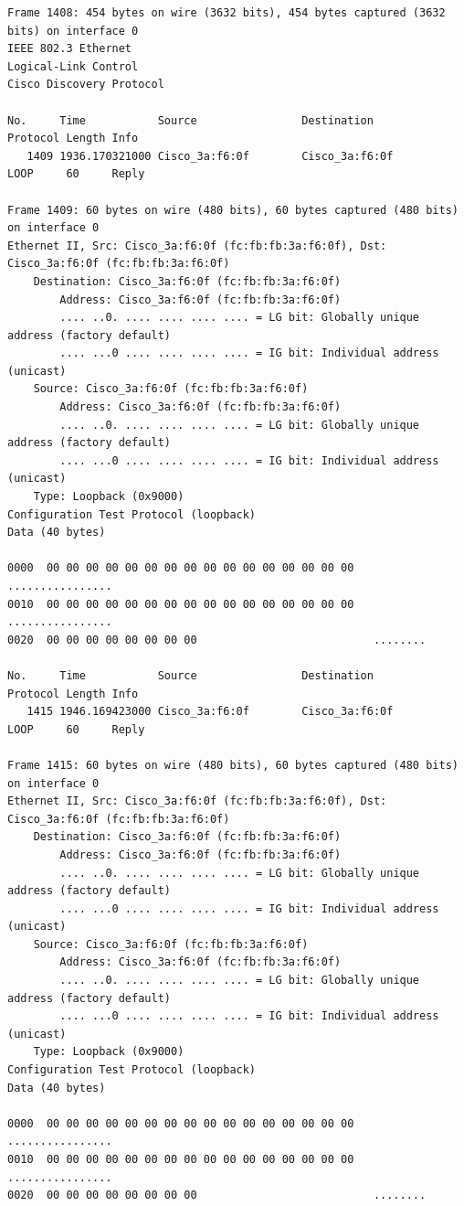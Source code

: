 \documentclass[a4paper,11pt]{article}
\begin{document}
\begin{lstlisting}
Frame 1408: 454 bytes on wire (3632 bits), 454 bytes captured (3632 bits) on interface 0
IEEE 802.3 Ethernet 
Logical-Link Control
Cisco Discovery Protocol

No.     Time           Source                Destination           Protocol Length Info
   1409 1936.170321000 Cisco_3a:f6:0f        Cisco_3a:f6:0f        LOOP     60     Reply

Frame 1409: 60 bytes on wire (480 bits), 60 bytes captured (480 bits) on interface 0
Ethernet II, Src: Cisco_3a:f6:0f (fc:fb:fb:3a:f6:0f), Dst: Cisco_3a:f6:0f (fc:fb:fb:3a:f6:0f)
    Destination: Cisco_3a:f6:0f (fc:fb:fb:3a:f6:0f)
        Address: Cisco_3a:f6:0f (fc:fb:fb:3a:f6:0f)
        .... ..0. .... .... .... .... = LG bit: Globally unique address (factory default)
        .... ...0 .... .... .... .... = IG bit: Individual address (unicast)
    Source: Cisco_3a:f6:0f (fc:fb:fb:3a:f6:0f)
        Address: Cisco_3a:f6:0f (fc:fb:fb:3a:f6:0f)
        .... ..0. .... .... .... .... = LG bit: Globally unique address (factory default)
        .... ...0 .... .... .... .... = IG bit: Individual address (unicast)
    Type: Loopback (0x9000)
Configuration Test Protocol (loopback)
Data (40 bytes)

0000  00 00 00 00 00 00 00 00 00 00 00 00 00 00 00 00   ................
0010  00 00 00 00 00 00 00 00 00 00 00 00 00 00 00 00   ................
0020  00 00 00 00 00 00 00 00                           ........

No.     Time           Source                Destination           Protocol Length Info
   1415 1946.169423000 Cisco_3a:f6:0f        Cisco_3a:f6:0f        LOOP     60     Reply

Frame 1415: 60 bytes on wire (480 bits), 60 bytes captured (480 bits) on interface 0
Ethernet II, Src: Cisco_3a:f6:0f (fc:fb:fb:3a:f6:0f), Dst: Cisco_3a:f6:0f (fc:fb:fb:3a:f6:0f)
    Destination: Cisco_3a:f6:0f (fc:fb:fb:3a:f6:0f)
        Address: Cisco_3a:f6:0f (fc:fb:fb:3a:f6:0f)
        .... ..0. .... .... .... .... = LG bit: Globally unique address (factory default)
        .... ...0 .... .... .... .... = IG bit: Individual address (unicast)
    Source: Cisco_3a:f6:0f (fc:fb:fb:3a:f6:0f)
        Address: Cisco_3a:f6:0f (fc:fb:fb:3a:f6:0f)
        .... ..0. .... .... .... .... = LG bit: Globally unique address (factory default)
        .... ...0 .... .... .... .... = IG bit: Individual address (unicast)
    Type: Loopback (0x9000)
Configuration Test Protocol (loopback)
Data (40 bytes)

0000  00 00 00 00 00 00 00 00 00 00 00 00 00 00 00 00   ................
0010  00 00 00 00 00 00 00 00 00 00 00 00 00 00 00 00   ................
0020  00 00 00 00 00 00 00 00                           ........


\end{lstlisting}
\end{document}
